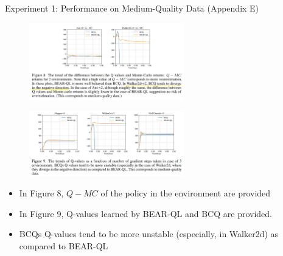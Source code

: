 \documentclass[11pt]{beamer}
\begin{document}
\begin{frame}{Experiment 1: Performance on Medium-Quality Data (Appendix E)}
    \begin{figure}
        \centering
        \includegraphics[width=0.6\textwidth]{Figure8.png}
    \end{figure}
    \begin{figure}
        \centering
        \includegraphics[width=0.6\textwidth]{Figure9.png}
    \end{figure}
        \begin{itemize}
        \item In Figure 8, $Q-MC$ of the policy in the environment are provided
        \item In Figure 9, Q-values learned by BEAR-QL and BCQ are provided.
        \item BCQs Q-values tend to be more unstable (especially, in Walker2d) as compared to BEAR-QL
    \end{itemize}
\end{frame}
\end{document}
